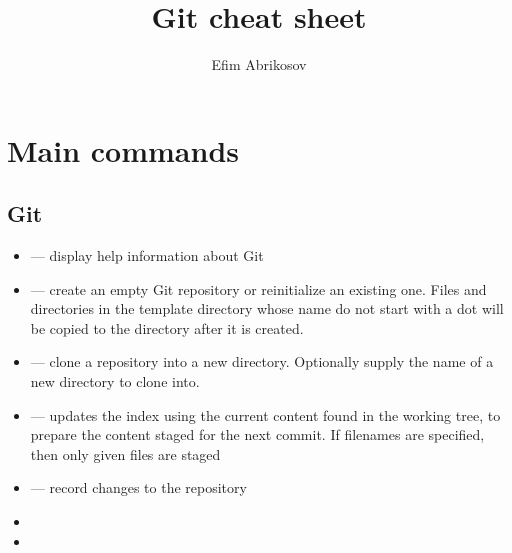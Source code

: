 \documentclass[12pt]{article}
\begin{document}
\title{Git cheat sheet}
\author{Efim Abrikosov}
\maketitle


\section{Main commands}
\subsection{Git}
\begin{itemize}
  \item {} --- display help information about Git
  \item {} --- create an empty Git repository or reinitialize an existing one. Files and directories in the template directory whose name do not start with a dot will be copied to the directory after it is created.
  \item {} --- clone a repository into a new directory. Optionally supply the name of a new directory to clone into.
  \item {} --- updates the index using the current content found in the working tree, to prepare the content staged for the next commit. If filenames are specified, then only given files are staged
  \item {} --- record changes to the repository
  \item {}
  \item {}
\end{itemize}
\end{document}
